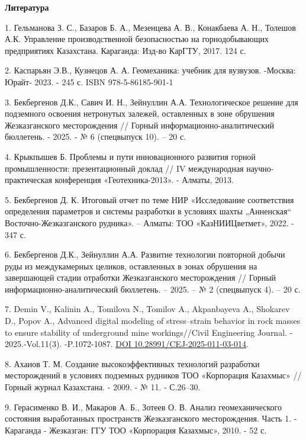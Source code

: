 \begin{center}
{\bfseries Литература}
\end{center}

\begin{refs}
1. Гельманова З. С., Базаров Б. А., Мезенцева А. В., Конакбаева А. Н.,
Толешов А.К. Управление производственной безопасностью на
горнодобывающих предприятиях Казахстана. Караганда: Изд-во КарГТУ, 2017.
124 с.

2. Каспарьян Э.В., Кузнецов А. А. Геомеханика: учебник для вузвузов.
-Москва: Юрайт- 2023. - 245 с. ISBN 978-5-86185-901-1

3. Бекбергенов Д.К., Савич И. Н., Зейнуллин А.А. Технологическое решение
для подземного освоения нетронутых залежей, оставленных в зоне обрушения
Жезказганского месторождения // Горный информационно-аналитический
бюллетень. - 2025. - № 6 (спецвыпуск 10). -- 20 с.

4. Крыкпышев Б. Проблемы и пути инновационного развития горной
промышленности: презентационный доклад // IV международная
научно-практическая конференция «Геотехника-2013». - Алматы, 2013.

5. Бекбергенов Д. К. Итоговый отчет по теме НИР «Исследование
соответствия определения параметров и системы разработки в условиях
шахты „Анненская`` Восточно-Жезказганского рудника». -- Алматы: ТОО
«КазНИИЦветмет», 2022. - 347 с.

6. Бекбергенов Д.К., Зейнуллин А.А. Развитие технологии повторной добычи
руды из междукамерных целиков, оставленных в зонах обрушения на
завершающей стадии отработки Жезказганского месторождения // Горный
информационно-аналитический бюллетень. -- 2025. -- № 2 (спецвыпуск 4).
-- 20 с.

7. Demin V., Kalinin A., Tomilova N., Tomilov A., Akpanbayeva A.,
Shokarev D., Popov A., Advanced digital modeling of stress--strain
behavior in rock masses to ensure stability of underground mine
workings//Civil Engineering Journal. - 2025.-Vol.11(3). -P.1072-1087.
\href{https://doi.org/10.28991/CEJ-2025-011-03-014}{DOI
10.28991/CEJ-2025-011-03-014}.

8. Аханов Т. М. Создание высокоэффективных технологий разработки
месторождений в условиях подземных рудников ТОО «Корпорация Казахмыс» //
Горный журнал Казахстана. - 2009. - № 11. - С.26--30.

9. Герасименко В. И., Макаров А. Б., Зотеев О. В. Анализ
геомеханического состояния выработанных пространств Жезказганского
месторождения. Часть 1. - Караганда - Жезказган: ГГУ ТОО «Корпорация
Казахмыс», 2010. - 52 с.


\end{refs}
